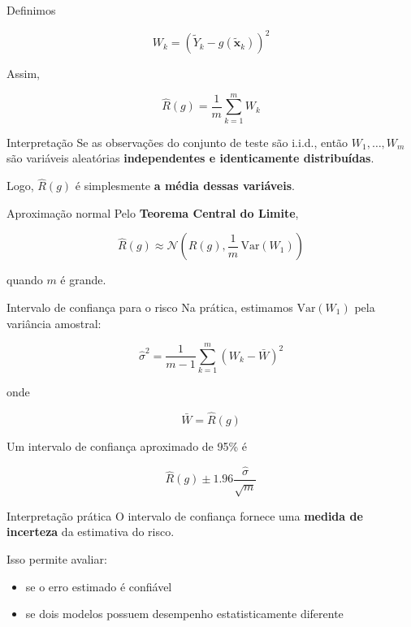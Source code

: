 \documentclass[
  ignorenonframetext,
  aspectratio=169,
]{beamer}
\providecommand{\tightlist}{%
  \setlength{\itemsep}{0pt}\setlength{\parskip}{0pt}}
\begin{document}
\begin{frame}
Definimos

\[
W_k = (\tilde Y_k - g(\tilde{\mathbf{x}}_k))^2
\]

Assim,

\[
\hat R(g) = \frac{1}{m}\sum_{k=1}^{m} W_k
\]

\begin{block}{Interpretação}
\label{interpretauxe7uxe3o-6}
Se as observações do conjunto de teste são i.i.d., então
\(W_1,\ldots,W_m\) são variáveis aleatórias \textbf{independentes e
identicamente distribuídas}.

Logo, \(\hat R(g)\) é simplesmente \textbf{a média dessas variáveis}.
\end{block}
\end{frame}

\begin{frame}
\begin{block}{Aproximação normal}
\label{aproximauxe7uxe3o-normal}
Pelo \textbf{Teorema Central do Limite},

\[
\hat R(g)
\approx
\mathcal{N}
\left(
R(g),
\frac{1}{m}\,\mathrm{Var}(W_1)
\right)
\]

quando \(m\) é grande.
\end{block}

\begin{block}{Intervalo de confiança para o risco}
\label{intervalo-de-confianuxe7a-para-o-risco}
Na prática, estimamos \(\mathrm{Var}(W_1)\) pela variância amostral:

\[
\hat\sigma^2
=
\frac{1}{m-1}
\sum_{k=1}^{m}
(W_k - \bar W)^2
\]
\end{block}
\end{frame}

\begin{frame}
onde

\[
\bar W = \hat R(g)
\]

Um intervalo de confiança aproximado de 95\% é

\[
\hat R(g)
\pm
1.96
\frac{\hat\sigma}{\sqrt{m}}
\]
\end{frame}

\begin{frame}
\begin{block}{Interpretação prática}
\label{interpretauxe7uxe3o-pruxe1tica}
O intervalo de confiança fornece uma \textbf{medida de incerteza} da
estimativa do risco.

Isso permite avaliar:

\begin{itemize}
\tightlist
\item
  se o erro estimado é confiável
\item
  se dois modelos possuem desempenho estatisticamente diferente
\end{itemize}
\end{block}
\end{frame}
\end{document}
